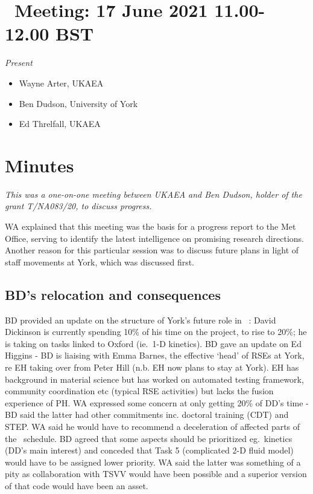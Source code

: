 \section{{\nep \  Meeting: 17 June 2021 11.00-12.00 BST}}

\emph{Present}

\begin{itemize}
\item{Wayne Arter, UKAEA}
\item{Ben Dudson, University of York}
\item{Ed Threlfall, UKAEA}
\end{itemize}

\section{Minutes}

{\it This was a one-on-one meeting between UKAEA and Ben Dudson, holder of the 
grant T/NA083/20, to discuss progress.}

WA explained that this meeting was the basis for a progress report to the Met 
Office, serving to identify the latest intelligence on promising 
research directions.  Another reason for this particular session was to discuss 
future plans in light of staff movements at York, which was discussed first.

\subsection{BD's relocation and consequences}\label{sec:reloc}

BD provided an update on the structure of York's future role in \nep \  : David 
Dickinson is currently spending 10\% of his time on the project, to rise to 
20\%; he is taking on tasks linked to Oxford (ie.\ 1-D kinetics).  BD gave an 
update on Ed Higgins - BD is liaising with Emma Barnes, the effective `head' of 
RSEs at York, re EH taking over from Peter Hill (n.b. EH now plans to stay at 
York).  EH has background in material science but has worked on automated 
testing framework, community coordination etc (typical RSE activities) but 
lacks the fusion experience of PH.  WA expressed some concern at only getting 
20\% of DD's time - BD said the latter had other commitments inc. doctoral 
training (CDT) and STEP.  WA said he would have to recommend a deceleration of 
affected parts of the \nep \   schedule.  BD agreed that some aspects should be 
prioritized eg.\ kinetics (DD's main interest) and conceded that Task 5 
(complicated 2-D fluid model) would have to be assigned lower priority.  WA said 
the latter was something of a pity as collaboration with TSVV would have been 
possible and a superior version of that code would have been an asset.


